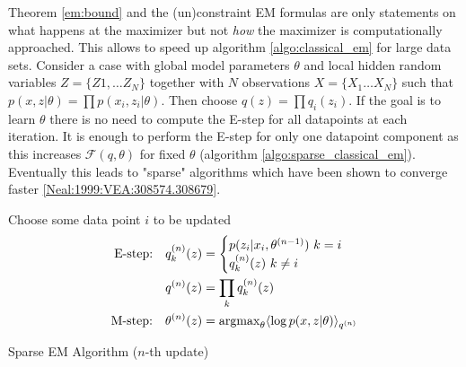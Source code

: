 Theorem \ref{em:bound} and the (un)constraint EM formulas are only statements on what happens at the maximizer but not \textit{how} the maximizer is computationally approached. This allows to speed up algorithm \ref{algo:classical_em} for large data sets. Consider a case with global model parameters $\theta$ and local hidden random variables $Z = \{Z1,\dots Z_N\}$ together with $N$ observations $X = \{X_1\dots X_N\}$ such that $p(x,z|\theta) = \prod p(x_i,z_i|\theta)$.  Then choose $q(z)= \prod q_i(z_i)$.  If the goal is to learn $\theta$ there is no need to compute the E-step for all datapoints at each iteration. It is enough to perform the E-step for only one datapoint component as this increases $\mathcal F(q, \theta)$ for fixed $\theta$ (algorithm \ref{algo:sparse_classical_em}). Eventually this leads to "sparse" algorithms which have been shown to converge faster \ref{Neal:1999:VEA:308574.308679}.
 \begin{algorithm}[t] \label{algo:sparse_classical_em}
	Choose some data point $i$ to be updated 
	\begin{align*}
		\text{E-step:\quad} q^{(n)}_k(z) &= \begin{cases}
					p(z_i|x_i,\theta^{(n-1)}) ~ k=i \\
					q^{(n)}_k(z)  ~ k\neq i 
	               \end{cases} \\
	               q^{(n)}(z) &=  \prod_k q^{(n)}_k(z) \\
	    \text{M-step:\quad}  \theta^{(n)}(z) & = \operatorname{argmax}_\theta \langle \log p(x, z | \theta) \rangle_{q^{(n)}}
	\end{align*} 
	\caption{Sparse EM Algorithm ($n$-th update)}
\end{algorithm}
